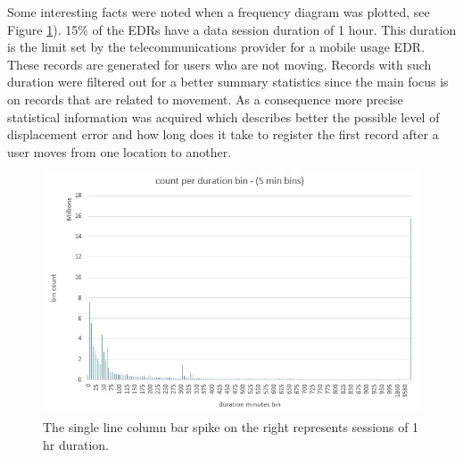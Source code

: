 \documentclass[12pt, a4paper]{report}
\theoremstyle{definition}
\theoremstyle{definition}%
\theoremstyle{definition}%
\theoremstyle{definition}%
\theoremstyle{definition}%
\theoremstyle{definition}%
\begin{document}
\begin{table}[h]
	\centering
	\caption{Basic summary statistics of main EDR dataset.} 
	\label{table:summary statistics}
\end{table}


Some interesting facts were noted when a frequency diagram was plotted, see Figure \ref{fig:data_session_duration_bin_count}). 15\% of the EDRs have a data session duration of 1 hour. This duration is the limit set by the telecommunications provider for a mobile usage EDR. These records are generated for users who are not moving. Records with such duration were filtered out for a better summary statistics since the main focus is on records that are related to movement. As a consequence more precise statistical information was acquired which describes better the possible level of displacement error and how long does it take to register the first record after a user moves from one location to another.

 
\begin{figure}	
	\includegraphics[scale=0.75]{data_session_duration_bin_count.jpg}
	\centering
	\caption[Data session duration distribution]{The single line column bar spike on the right represents sessions of 1 hr duration.}
	\label{fig:data_session_duration_bin_count}
\end{figure}
\end{document}
